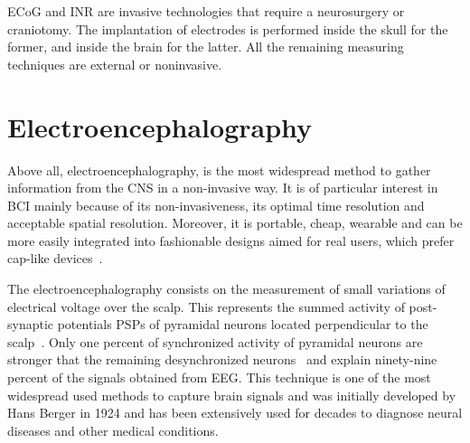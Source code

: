ECoG and INR are invasive technologies that require a neurosurgery or craniotomy. The implantation of electrodes is performed inside the skull for the former, and inside the brain for the latter.  All the remaining measuring techniques are external or noninvasive.  

\section{Electroencephalography}
\label{EEG}
Above all, electroencephalography, is the most widespread method to gather information from the CNS in a non-invasive way. It is of particular interest in BCI mainly because of its non-invasiveness, its optimal time resolution and acceptable spatial resolution. Moreover, it is portable, cheap, wearable and can be more easily integrated into fashionable designs aimed for real users, which prefer cap-like devices~\cite{Huggins2015}. 

The electroencephalography consists on the measurement of small variations of electrical voltage over the scalp.  This represents the summed activity of post-synaptic potentials PSPs of pyramidal neurons located perpendicular to the scalp~\cite{Nam2018}. Only one percent of synchronized activity of pyramidal neurons are stronger that the remaining desynchronized neurons~\cite{Schomer2010} and explain ninety-nine percent of the signals obtained from EEG.  This technique is one of the most widespread used methods to capture brain signals and was initially developed by Hans Berger in 1924 and has been extensively used for decades to diagnose neural diseases and other medical conditions.



